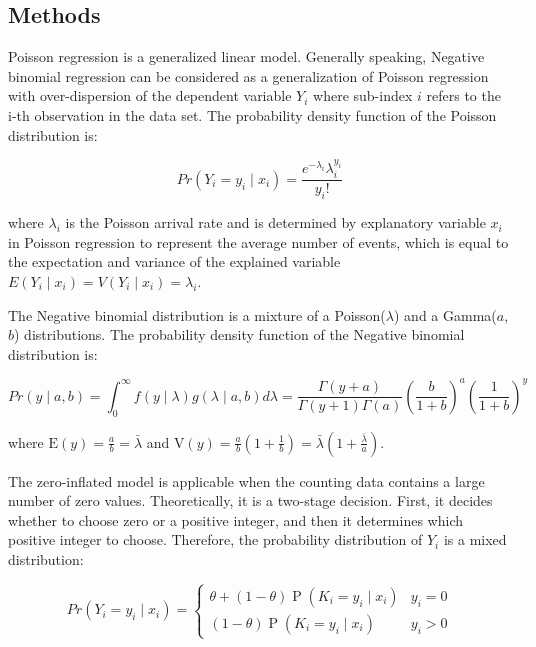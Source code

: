 \documentclass[entropy,article,submit,moreauthors,LaTeX and dvi2pdf]{Definitions/mdpi}
\begin{document}
\begin{paracol}{2}
\linenumbers
\switchcolumn
\section{Methods}
Poisson regression is a generalized linear model. Generally speaking, Negative binomial regression can be considered as a generalization of Poisson regression with over-dispersion of the dependent variable $Y_i$ where sub-index $i$ refers to the i-th observation in the data set. The probability density function of the Poisson distribution is:

\begin{equation}
    Pr(Y_i=y_i\mid x_i)=\frac{e^{-\lambda _i} \lambda_i ^{y_i}} {y_i!}
\end{equation}

where $\lambda_i$ is the Poisson arrival rate and is determined by explanatory variable $x_i$ in Poisson regression to represent the average number of events, which is equal to the expectation and variance of the explained variable $E(Y_i\mid x_i)=V(Y_i\mid x_i)=\lambda_i$.

The Negative binomial distribution is a mixture of a Poisson($\lambda$) and a Gamma($a$,$b$) distributions. The probability density function of the Negative binomial distribution is:

\begin{equation}
    Pr(y \mid a, b)=\int_{0}^{\infty} f(y \mid \lambda) g(\lambda \mid a, b) d \lambda= \frac{\Gamma(y+a)}{\Gamma(y+1) \Gamma(a)}\left(\frac{b}{1+b}\right)^{a}\left(\frac{1}{1+b}\right)^{y}
\end{equation}

where $\mathrm{E}(y)=\frac{a}{b}=\bar{\lambda}$ and $\mathrm{V}(y)=\frac{a}{b}\left(1+\frac{1}{b}\right)=\bar{\lambda}\left(1+\frac{\bar{\lambda}}{a}\right)$.

The zero-inflated model is applicable when the counting data contains a large number of zero values. Theoretically, it is a two-stage decision. First, it decides whether to choose zero or a positive integer, and then it determines which positive integer to choose. Therefore, the probability distribution of $Y_i$ is a mixed distribution:

\begin{equation}
    Pr\left(Y_{i}=y_{i} \mid {x}_{i}\right)=\left\{\begin{array}{ll}
\theta + (1-\theta) \operatorname{P}\left(K_{i}=y_{i} \mid {x}_{i}\right) & y_{i}=0 \\
(1-\theta) \operatorname{P}\left(K_{i}=y_{i} \mid {x}_{i}\right) & y_{i}>0
\end{array}\right.
\end{equation}


\end{paracol}
\end{document}
